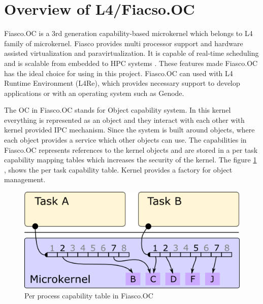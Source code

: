 \section{Overview of L4/Fiacso.OC} \label{founcations:overfiasco}
Fiasco.OC is a 3rd generation capability-based microkernel which belongs to L4 family of microkernel. Fiasco provides multi processor support and hardware assisted virtualization and paravirtualization. It is capable of real-time scheduling and is scalable from embedded to HPC systems \cite{foc_feat}. These features made Fiasco.OC has the ideal choice for using in this project. Fiasco.OC can used with L4 Runtime Environment (L4Re), which provides necessary support to develop applications or with an operating system such as Genode.

The OC in Fiasco.OC stands for Object capability system. In this kernel everything is represented as an object and they interact with each other with kernel provided IPC mechanism. Since the system is built around objects, where each object provides a service which other objects can use. The capabilities in Fiasco.OC represents references to the kernel objects and are stored in a per task capability mapping tables which increases the security of the kernel. The figure \ref{fig:foc_cap} \cite{foc_pdf}, shows the per task capability table. Kernel provides a factory for object management.

\begin{figure}[h]
\centering
\includegraphics[width=0.7\linewidth]{figures/foc_cap.png}
\caption {Per process capability table in Fiasco.OC \cite{foc_pdf}}
\label{fig:foc_cap}
\end{figure}

